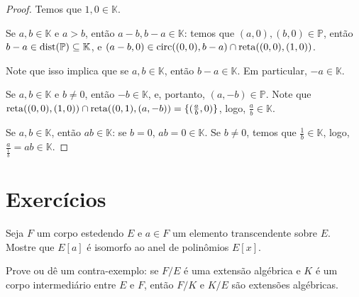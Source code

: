 \begin{proof}
    Temos que $1, 0 \in \mathbb K$.

    Se $a, b \in \mathbb K$ e $a>b$, então $a-b, b-a \in \mathbb K$: temos que $(a, 0), (b, 0) \in \mathbb P$, então $b-a \in \operatorname{dist}(\mathbb P)\subseteq \mathbb K$, e $(a-b, 0) \in \operatorname{circ}((0, 0), b-a)\cap \operatorname{reta}((0, 0), (1, 0))$.

    Note que isso implica que se $a, b \in \mathbb K$, então $b-a\in \mathbb K$. Em particular, $-a \in \mathbb K$.

    Se $a, b \in \mathbb K$ e $b\neq 0$, então $-b \in \mathbb K$, e, portanto, $(a, -b)\in \mathbb P$. Note que $\operatorname{reta}((0, 0), (1, 0))\cap \operatorname{reta}((0, 1), (a, -b))=\{(\frac ab, 0)\}$, logo, $\frac ab \in \mathbb K$.

    Se $a, b \in \mathbb K$, então $ab \in \mathbb K$: se $b=0$, $ab=0\in \mathbb K$. Se $b\neq 0$, temos que $\frac 1b\in \mathbb K$, logo, $\frac{a}{\frac1b}=ab\in \mathbb K$.
\end{proof}

\section{Exercícios}
\begin{exer}
    Seja $F$ um corpo estedendo $E$ e $a \in F$ um elemento transcendente sobre $E$. Mostre que $E[a]$ é isomorfo ao anel de polinômios $E[x]$.
\end{exer}

\begin{exer}
    Prove ou dê um contra-exemplo: se $F/E$ é uma extensão algébrica e $K$ é um corpo intermediário entre $E$ e $F$, então $F/K$ e $K/E$ são extensões algébricas.
\end{exer}
